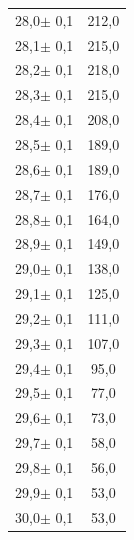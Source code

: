\documentclass[titlepage = firstcover]{scrartcl}
\begin{document}
\begin{table}
\begin{tabular} {c c}
                28,0$\pm$ 0,1 & 	212,0   \\
                28,1$\pm$ 0,1 & 	215,0   \\
                28,2$\pm$ 0,1 & 	218,0   \\
                28,3$\pm$ 0,1 & 	215,0   \\
                28,4$\pm$ 0,1 & 	208,0   \\
                28,5$\pm$ 0,1 & 	189,0   \\
                28,6$\pm$ 0,1 & 	189,0   \\
                28,7$\pm$ 0,1 & 	176,0   \\
                28,8$\pm$ 0,1 & 	164,0   \\
                28,9$\pm$ 0,1 & 	149,0   \\
                29,0$\pm$ 0,1 & 	138,0   \\
                29,1$\pm$ 0,1 & 	125,0   \\
                29,2$\pm$ 0,1 & 	111,0   \\
                29,3$\pm$ 0,1 & 	107,0   \\
                29,4$\pm$ 0,1 & 	95,0    \\
                29,5$\pm$ 0,1 & 	77,0    \\
                29,6$\pm$ 0,1 & 	73,0    \\
                29,7$\pm$ 0,1 & 	58,0    \\
                29,8$\pm$ 0,1 & 	56,0    \\
                29,9$\pm$ 0,1 & 	53,0    \\
                30,0$\pm$ 0,1 & 	53,0    \\
                \bottomrule  
              \end{tabular}
            \end{table}
            \FloatBarrier

            \newpage
\end{document}
